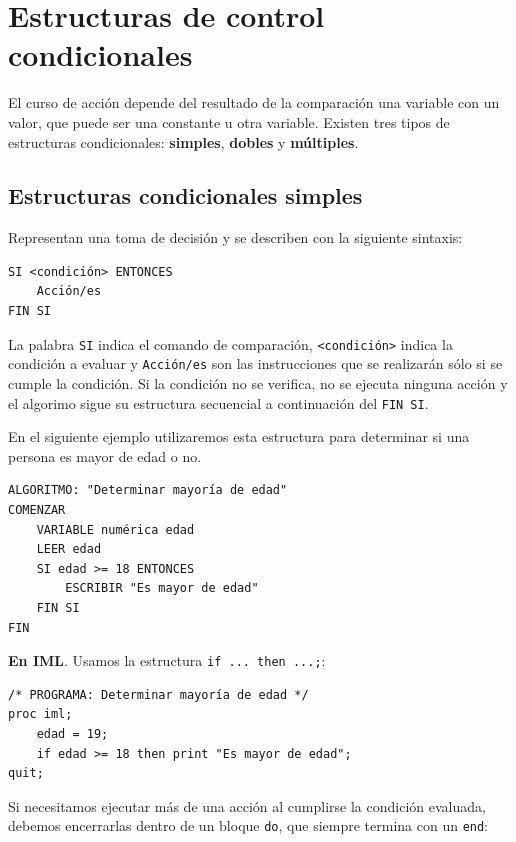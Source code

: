 \documentclass[]{book}
\begin{document}
\section{Estructuras de control
condicionales}\label{estructuras-de-control-condicionales}

El curso de acción depende del resultado de la comparación una variable
con un valor, que puede ser una constante u otra variable. Existen tres
tipos de estructuras condicionales: \textbf{simples}, \textbf{dobles} y
\textbf{múltiples}.

\subsection{Estructuras condicionales
simples}\label{estructuras-condicionales-simples}

Representan una toma de decisión y se describen con la siguiente
sintaxis:

\begin{verbatim}
SI <condición> ENTONCES
    Acción/es
FIN SI
\end{verbatim}

La palabra \texttt{SI} indica el comando de comparación,
\texttt{\textless{}condición\textgreater{}} indica la condición a
evaluar y \texttt{Acción/es} son las instrucciones que se realizarán
sólo si se cumple la condición. Si la condición no se verifica, no se
ejecuta ninguna acción y el algorimo sigue su estructura secuencial a
continuación del \texttt{FIN\ SI}.

En el siguiente ejemplo utilizaremos esta estructura para determinar si
una persona es mayor de edad o no.

\begin{verbatim}
ALGORITMO: "Determinar mayoría de edad"
COMENZAR
    VARIABLE numérica edad
    LEER edad
    SI edad >= 18 ENTONCES
        ESCRIBIR "Es mayor de edad"
    FIN SI
FIN
\end{verbatim}

\textbf{En IML}. Usamos la estructura \texttt{if\ ...\ then\ ...;}:

\begin{verbatim}
/* PROGRAMA: Determinar mayoría de edad */
proc iml;
    edad = 19;
    if edad >= 18 then print "Es mayor de edad";
quit;
\end{verbatim}

Si necesitamos ejecutar más de una acción al cumplirse la condición
evaluada, debemos encerrarlas dentro de un bloque \texttt{do}, que
siempre termina con un \texttt{end}:
\end{document}
